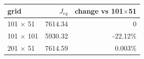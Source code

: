 \begin{tabular}{lrr}
\toprule
grid & $J_{eq}$ & change vs 101$\times$51 \\
\midrule
101 $\times$ 51 & 7614.34 & 0 \\
101 $\times$ 101 & 5930.32 & -22.12\% \\
201 $\times$ 51 & 7614.59 & 0.003\% \\
\bottomrule
\end{tabular}
